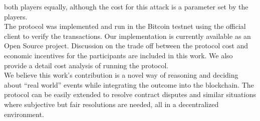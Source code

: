  both players equally, although the cost for this attack is a parameter set by
  the players.\\
\noindent
The protocol was implemented and run in the Bitcoin testnet using the official
  client to verify the transactions.
Our implementation is currently available as an Open Source project.
Discussion on the trade off between the protocol cost and economic incentives
  for the participants are included in this work.
We also provide a detail cost analysis of running the protocol.\\
\noindent
We believe this work's contribution is a novel way of reasoning and deciding
  about ``real world'' events while integrating the outcome into the blockchain.
The protocol can be easily extended to resolve contract disputes and similar
  situations where subjective but fair resolutions are needed, all in a
  decentralized environment.
